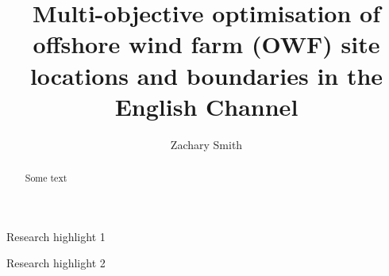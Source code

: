 \documentclass[preprint,12pt,authoryear]{elsarticle}
\begin{document}
\begin{frontmatter}



\title{Multi-objective optimisation of offshore wind farm (OWF) site locations and boundaries in the English Channel}


\author{Zachary Smith}

\begin{abstract}
Some text
\end{abstract}

\begin{graphicalabstract}
\end{graphicalabstract}

\begin{highlights}
\item Research highlight 1
\item Research highlight 2
\end{highlights}


\end{frontmatter}
\end{document}
